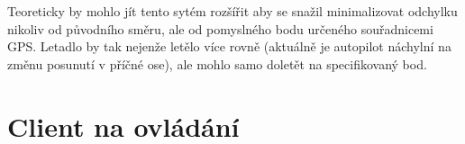 \documentclass[a4paper,oneside,12pt]{report}
\let\openright=\clearpage
\begin{document}
Teoreticky by mohlo jít tento sytém rozšířit aby se snažil minimalizovat odchylku nikoliv od původního směru, ale od pomyslného bodu určeného souřadnicemi GPS.
Letadlo by tak nejenže letělo více rovně (aktuálně je autopilot náchylní na změnu posunutí v příčné ose), ale mohlo samo doletět na specifikovaný bod.


\chapter{Client na ovládání}




\chapter*{}
\setcounter{page}{6} %





\listoffigures
\openright
\end{document}
